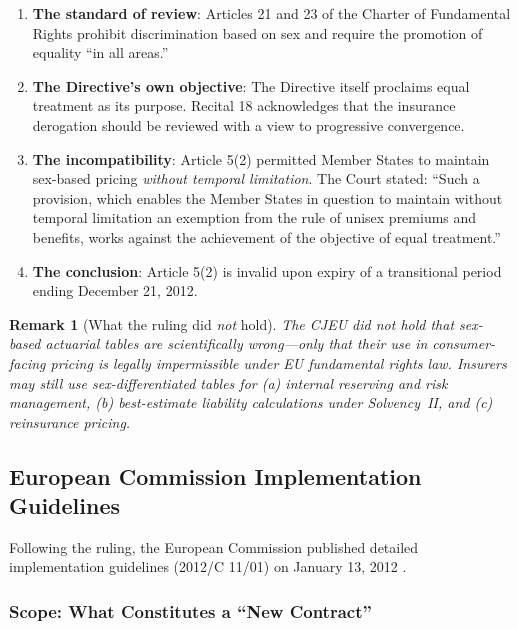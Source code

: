 \documentclass[12pt,a4paper]{article}
\newtheorem{remark}[definition]{Remark}
\begin{document}
\begin{enumerate}
  \item \textbf{The standard of review}: Articles 21 and 23 of the Charter of Fundamental Rights prohibit discrimination based on sex and require the promotion of equality ``in all areas.''

  \item \textbf{The Directive's own objective}: The Directive itself proclaims equal treatment as its purpose. Recital 18 acknowledges that the insurance derogation should be reviewed with a view to progressive convergence.

  \item \textbf{The incompatibility}: Article 5(2) permitted Member States to maintain sex-based pricing \emph{without temporal limitation}. The Court stated: ``Such a provision, which enables the Member States in question to maintain without temporal limitation an exemption from the rule of unisex premiums and benefits, works against the achievement of the objective of equal treatment.''

  \item \textbf{The conclusion}: Article 5(2) is invalid upon expiry of a transitional period ending December 21, 2012.
\end{enumerate}

\begin{remark}[What the ruling did \emph{not} hold]
The CJEU did not hold that sex-based actuarial tables are scientifically wrong---only that their use in consumer-facing pricing is legally impermissible under EU fundamental rights law. Insurers may still use sex-differentiated tables for (a) internal reserving and risk management, (b) best-estimate liability calculations under Solvency~II, and (c) reinsurance pricing.
\end{remark}

\subsection{European Commission Implementation Guidelines}
\label{subsec:guidelines}

Following the ruling, the European Commission published detailed implementation guidelines (2012/C 11/01) on January 13, 2012 \cite{ec_guidelines2012}.

\subsubsection{Scope: What Constitutes a ``New Contract''}
\end{document}
